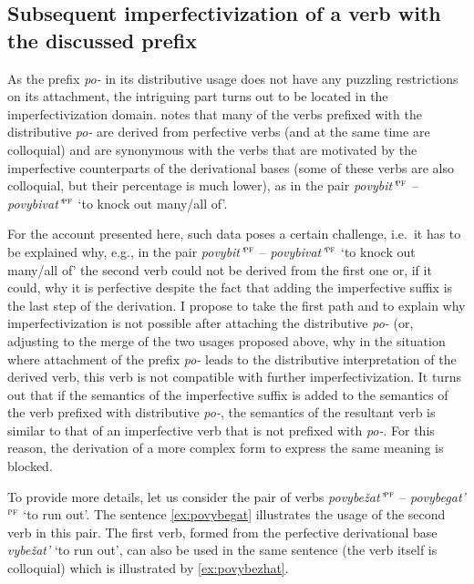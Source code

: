 \subsection{Subsequent imperfectivization of a verb with the discussed prefix}
As the prefix \textit{po-} in its distributive usage does not have any puzzling restrictions on its attachment, the intriguing part turns out to be located in the imperfectivization domain. \citet[365]{Shvedova:82} notes that many of the verbs prefixed with the distributive \textit{po-} are derived from perfective verbs (and at the same time are colloquial) and are synonymous with the verbs that are motivated by the imperfective counterparts of the derivational bases (some of these verbs are also colloquial, but their percentage is much lower), as in the pair \textit{povybit'}$^{\textsc{pf}}$ -- \textit{povybivat'}$^{\textsc{pf}}$ `to knock out many/all of'.

For the account presented here, such data poses a certain challenge, i.e.\ it has to be explained why, e.g., in the pair \textit{povybit'}$^{\textsc{pf}}$ -- \textit{povybivat'}$^{\textsc{pf}}$ `to knock out many/all of' the second verb could not be derived from the first one or, if it could, why it is perfective despite the fact that adding the imperfective suffix is the last step of the derivation. I propose to take the first path and to explain why imperfectivization is not possible after attaching the distributive \textit{po-} (or, adjusting to the merge of the two usages proposed above, why in the situation where attachment of the prefix \textit{po-} leads to the distributive interpretation of the derived verb, this verb is not compatible with further imperfectivization. It turns out that if the semantics of the imperfective suffix is added to the semantics of the verb prefixed with distributive \textit{po-}, the semantics of the resultant verb is similar to that of an imperfective verb that is not prefixed with \textit{po-}. For this reason, the derivation of a more complex form to express the same meaning is blocked.

To provide more details, let us consider the pair of verbs \textit{povybe\v{z}at'}$^{\textsc{pf}}$ -- \textit{po\-vy\-be\-gat'}$^{\textsc{pf}}$ `to run out'. The sentence \ref{ex:povybegat} illustrates the usage of the second verb in this pair. The first verb, formed from the perfective derivational base \textit{vybe\v{z}at'} `to run out', can also be used in the same sentence (the verb itself is colloquial) which is illustrated by \ref{ex:povybezhat}.

